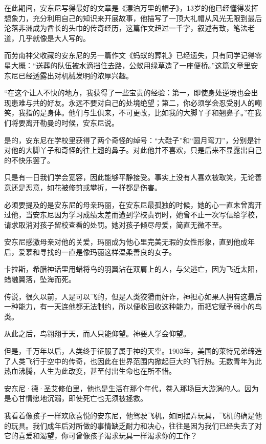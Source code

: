 在此期间，安东尼写得最好的文章是《漂泊万里的帽子》，13岁的他已经懂得发挥想象力，充分利用自己的知识来开展故事，他描写了一顶大礼帽从风光无限到最后沦落非洲成为酋长的头巾的传奇经历，这篇作文超过一千字，叙述有致，笔法老道，几乎就像是大人写的。

而劳南神父收藏的安东尼的另一篇作文《蚂蚁的葬礼》已经遗失，只有同学记得零星大概：“送葬的队伍被水滴挡住去路，公蚁用绿草造了一座便桥。”这篇文章里安东尼已经透露出对机械发明的浓厚兴趣。

“在这个让人不快的地方，我获得了一些宝贵的经验：第一，即使身处逆境也会出现患难与共的好友。永远不要对自己的处境绝望；第二，你必须学会忍受别人的嘲笑，我指的是身体。他们与生俱来，不可更改，比如我的大脚丫子和翘鼻子。”在我们将要离开勒曼的时候，安东尼说。

是的，安东尼在学校里获得了两个奇怪的绰号：“大鞋子”和“圆月弯刀”，分别是针对他的大脚丫子和奇怪的往上翘的鼻子。对此他并不喜欢，只是后来不显露出自己的不快乐罢了。

只是有一日我们学会宽容，因此能够平静接受。事实上没有人喜欢被取笑，无论善意还是恶意，如花被修剪或攀折，一样都是伤害。

必须要提及的是安东尼的母亲玛丽，在安东尼最孤独的时候，她的心一直未曾离开过他，当安东尼因为学习成绩太差而遭到学校责罚时，她曾不止一次写信给学校，请求取消对孩子留校查看的处罚。她对孩子倾尽母爱，简直无微不至。

安东尼感激母亲对他的关爱，玛丽成为他心里完美无瑕的女性形象，直到他成年后，爱慕和寻找的一直是像玛丽这样温柔善良的女子。


\stoptitle

\starttitle[title={4}]

卡拉斯，希腊神话里用蜡将鸟的羽翼沾在双肩上的人，与父逃亡，因为飞近太阳，蜡融翼落，坠海而死。

传说，很久以前，人是可以飞的，但是人类狡猾而奸诈，神担心如果人拥有这最后一种能力，有一天连他都无法制约，所以便收回收这种能力，而把它赋予弱小的鸟类。

从此之后，鸟翱翔于天，而人只能仰望。神要人学会仰望。

但是，千万年以后，人类终于征服了属于神的天空。1903年，美国的莱特兄弟缔造了人类飞行于空中的传奇，也因此在世界范围内掀起巨大的飞行热。无数青年为此热血沸腾，人生为此改变，甚至付出生命也在所不惜。

安东尼·德·圣艾修伯里，他也是生活在那个年代，卷入那场巨大漩涡的人。因为是心甘情愿地沉溺，即使死亡也无须被拯救。

我看着像孩子一样欢欣喜悦的安东尼，他驾驶飞机，如同摆弄玩具，飞机的确是他的玩具。我们成年后对所做的事情缺乏耐力和决心，往往是因为我们已经失去了对它的喜爱和渴望，你可曾像孩子渴求玩具一样渴求你的工作？

